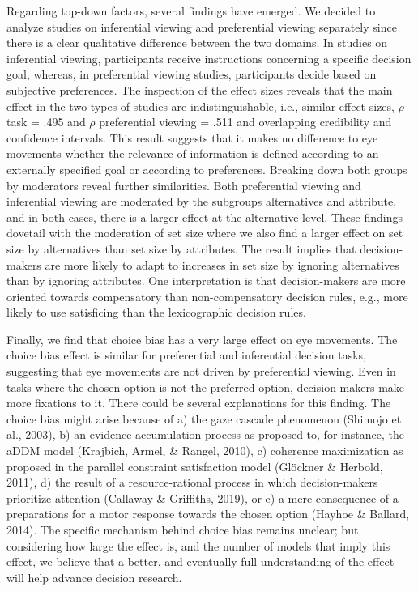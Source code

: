 \documentclass{article}
\begin{document}
Regarding top-down factors, several findings have emerged. We decided to analyze studies on inferential viewing and preferential viewing separately since there is a clear qualitative difference between the two domains. In studies on inferential viewing, participants receive instructions concerning a specific decision goal, whereas, in preferential viewing studies, participants decide based on subjective preferences. The inspection of the effect sizes reveals that the main effect in the two types of studies are indistinguishable, i.e., similar effect sizes, $\rho$ task = .495 and $\rho$ preferential viewing  = .511 and overlapping credibility and confidence intervals. This result suggests that it makes no difference to eye movements whether the relevance of information is defined according to an externally specified goal or according to preferences. Breaking down both groups by moderators reveal further similarities. Both preferential viewing and inferential viewing are moderated by the subgroups alternatives and attribute, and in both cases, there is a larger effect at the alternative level. These findings dovetail with the moderation of set size where we also find a larger effect on set size by alternatives than set size by attributes. The result implies that decision-makers are more likely to adapt to increases in set size by ignoring alternatives than by ignoring attributes. One interpretation is that decision-makers are more oriented towards compensatory than non-compensatory decision rules, e.g., more likely to use satisficing than the lexicographic decision rules. 

Finally, we find that choice bias has a very large effect on eye movements. The choice bias effect is similar for preferential and inferential decision tasks, suggesting that eye movements are not driven by preferential viewing. Even in tasks where the chosen option is not the preferred option, decision-makers make more fixations to it. There could be several explanations for this finding. The choice bias might arise because of  a) the gaze cascade phenomenon (Shimojo et al., 2003), b) an evidence accumulation process as proposed to, for instance, the aDDM model (Krajbich, Armel, \& Rangel, 2010), c) coherence maximization as proposed in the parallel constraint satisfaction model (Glöckner \& Herbold, 2011), d) the result of a resource-rational process in which decision-makers prioritize attention (Callaway \& Griffiths, 2019), or e) a mere consequence of a preparations for a motor response towards the chosen option (Hayhoe \& Ballard, 2014). The specific mechanism behind choice bias remains unclear; but considering how large the effect is, and the number of models that imply this effect, we believe that a better, and eventually full understanding of the effect will help advance decision research. 
\end{document}
